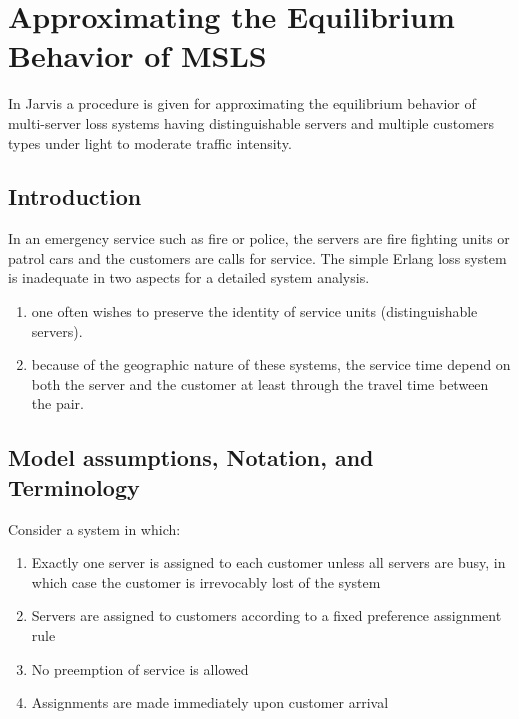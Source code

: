 
\section{Approximating the Equilibrium Behavior of MSLS}
\begin{frame}
  In Jarvis \cite{jarvis1985approximating}
  a procedure is given
  for approximating the equilibrium behavior of multi-server loss systems
  having distinguishable servers
  and multiple customers types
  under light to moderate traffic intensity.
\end{frame}

\subsection{Introduction}
\begin{frame}
  In an emergency service
  such as fire or police, 
  the servers are fire fighting units or patrol cars
  and the customers are calls for service.
  The simple Erlang loss system
  is inadequate in two aspects
  for a detailed system analysis.
  \begin{enumerate}
  \item one often wishes to preserve the identity of service units
    (distinguishable servers).
  \item because of the geographic nature of these systems,
    the service time depend on both
    the server and the customer
    at least through the travel time between the pair.
  \end{enumerate}
\end{frame}

\subsection{Model assumptions, Notation, and Terminology}
\begin{frame}
  Consider a system in which:
  \begin{enumerate}
  \item Exactly one server is assigned to each customer
    unless all servers are busy, 
    in which case the customer is irrevocably lost of the system
  \item Servers are assigned to customers
    according to a fixed preference assignment rule
  \item No preemption of service is allowed
  \item Assignments are made immediately upon customer arrival
  \end{enumerate}
\end{frame}

